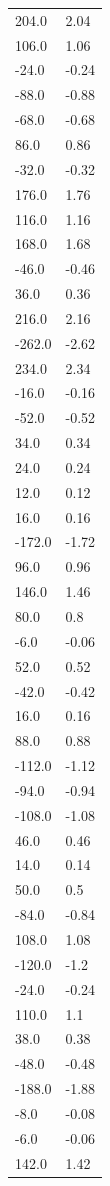 \begin{longtable}{ll}
204.0 & 2.04 \\
106.0 & 1.06 \\
-24.0 & -0.24 \\
-88.0 & -0.88 \\
-68.0 & -0.68 \\
86.0 & 0.86 \\
-32.0 & -0.32 \\
176.0 & 1.76 \\
116.0 & 1.16 \\
168.0 & 1.68 \\
-46.0 & -0.46 \\
36.0 & 0.36 \\
216.0 & 2.16 \\
-262.0 & -2.62 \\
234.0 & 2.34 \\
-16.0 & -0.16 \\
-52.0 & -0.52 \\
34.0 & 0.34 \\
24.0 & 0.24 \\
12.0 & 0.12 \\
16.0 & 0.16 \\
-172.0 & -1.72 \\
96.0 & 0.96 \\
146.0 & 1.46 \\
80.0 & 0.8 \\
-6.0 & -0.06 \\
52.0 & 0.52 \\
-42.0 & -0.42 \\
16.0 & 0.16 \\
88.0 & 0.88 \\
-112.0 & -1.12 \\
-94.0 & -0.94 \\
-108.0 & -1.08 \\
46.0 & 0.46 \\
14.0 & 0.14 \\
50.0 & 0.5 \\
-84.0 & -0.84 \\
108.0 & 1.08 \\
-120.0 & -1.2 \\
-24.0 & -0.24 \\
110.0 & 1.1 \\
38.0 & 0.38 \\
-48.0 & -0.48 \\
-188.0 & -1.88 \\
-8.0 & -0.08 \\
-6.0 & -0.06 \\
142.0 & 1.42 \\

\end{longtable}
